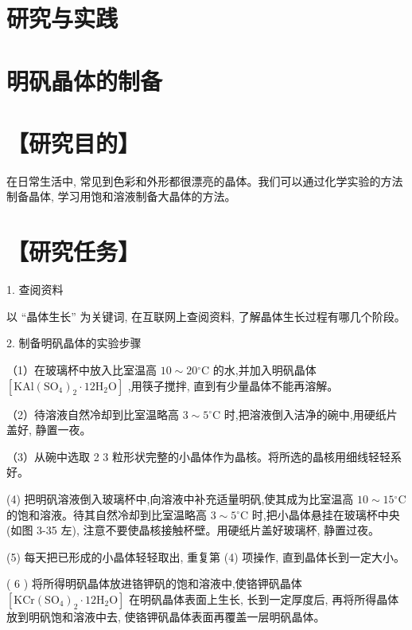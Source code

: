 \documentclass[10pt]{article}
\begin{document}
\section*{研究与实践}

\section*{明矾晶体的制备}

\section*{【研究目的】}

在日常生活中, 常见到色彩和外形都很漂亮的晶体。我们可以通过化学实验的方法制备晶体, 学习用饱和溶液制备大晶体的方法。

\section*{【研究任务】}

1. 查阅资料

以 “晶体生长” 为关键词, 在互联网上查阅资料, 了解晶体生长过程有哪几个阶段。

2. 制备明矾晶体的实验步骤

（1）在玻璃杯中放入比室温高 \({10} \sim {20}{}^{ \circ }\mathrm{C}\) 的水,并加入明矾晶体 \(\left\lbrack {\mathrm{{KAl}}{\left( {\mathrm{{SO}}}_{4}\right) }_{2} \cdot {12}{\mathrm{H}}_{2}\mathrm{O}}\right\rbrack\) ,用筷子搅拌, 直到有少量晶体不能再溶解。

（2）待溶液自然冷却到比室温略高 \(3 \sim 5{}^{ \circ }\mathrm{C}\) 时,把溶液倒入洁净的碗中,用硬纸片盖好, 静置一夜。

（3）从碗中选取 2 3 粒形状完整的小晶体作为晶核。将所选的晶核用细线轻轻系好。

(4) 把明矾溶液倒入玻璃杯中,向溶液中补充适量明矾,使其成为比室温高 \({10} \sim {15}{}^{ \circ }\mathrm{C}\) 的饱和溶液。待其自然冷却到比室温略高 \(3 \sim 5{}^{ \circ }\mathrm{C}\) 时,把小晶体悬挂在玻璃杯中央 (如图 3-35 左), 注意不要使晶核接触杯壁。用硬纸片盖好玻璃杯, 静置过夜。

(5) 每天把已形成的小晶体轻轻取出, 重复第 (4) 项操作, 直到晶体长到一定大小。

( 6 ) 将所得明矾晶体放进铬钾矾的饱和溶液中,使铬钾矾晶体 \(\left\lbrack {\mathrm{{KCr}}{\left( {\mathrm{{SO}}}_{4}\right) }_{2} \cdot {12}{\mathrm{H}}_{2}\mathrm{O}}\right\rbrack\) 在明矾晶体表面上生长, 长到一定厚度后, 再将所得晶体放到明矾饱和溶液中去, 使铬钾矾晶体表面再覆盖一层明矾晶体。
\end{document}
